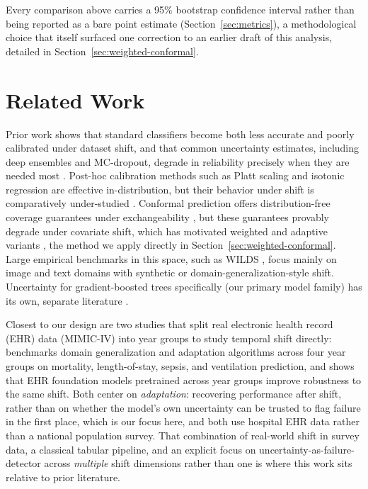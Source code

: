 \documentclass[11pt]{article}
\begin{document}
Every comparison above carries a 95\% bootstrap confidence interval rather than being reported as a bare point estimate (Section~\ref{sec:metrics}), a methodological choice that itself surfaced one correction to an earlier draft of this analysis, detailed in Section~\ref{sec:weighted-conformal}.

\section{Related Work}

Prior work shows that standard classifiers become both less accurate and poorly calibrated under dataset shift, and that common uncertainty estimates, including deep ensembles and MC-dropout, degrade in reliability precisely when they are needed most \citep{ovadia2019trust,lakshminarayanan2017ensembles,gal2016dropout}. Post-hoc calibration methods such as Platt scaling and isotonic regression are effective in-distribution, but their behavior under shift is comparatively under-studied \citep{guo2017calibration,niculescu2005predicting}. Conformal prediction offers distribution-free coverage guarantees under exchangeability \citep{vovk2005algorithmic}, but these guarantees provably degrade under covariate shift, which has motivated weighted and adaptive variants \citep{tibshirani2019conformal}, the method we apply directly in Section~\ref{sec:weighted-conformal}. Large empirical benchmarks in this space, such as WILDS \citep{koh2021wilds}, focus mainly on image and text domains with synthetic or domain-generalization-style shift. Uncertainty for gradient-boosted trees specifically (our primary model family) has its own, separate literature \citep{malinin2021uncertainty}.

Closest to our design are two studies that split real electronic health record (EHR) data (MIMIC-IV) into year groups to study temporal shift directly: \citet{guo2022evaluation} benchmarks domain generalization and adaptation algorithms across four year groups on mortality, length-of-stay, sepsis, and ventilation prediction, and \citet{guo2023ehr} shows that EHR foundation models pretrained across year groups improve robustness to the same shift. Both center on \emph{adaptation}: recovering performance after shift, rather than on whether the model's own uncertainty can be trusted to flag failure in the first place, which is our focus here, and both use hospital EHR data rather than a national population survey. That combination of real-world shift in survey data, a classical tabular pipeline, and an explicit focus on uncertainty-as-failure-detector across \emph{multiple} shift dimensions rather than one is where this work sits relative to prior literature.
\end{document}
